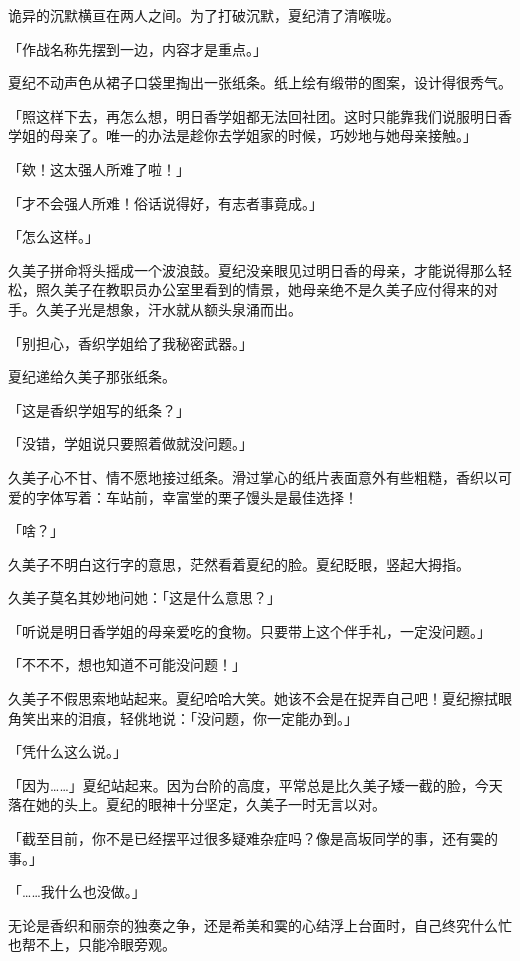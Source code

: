 \documentclass[UTF8]{ctexart}
\begin{document}
    诡异的沉默横亘在两人之间。为了打破沉默，夏纪清了清喉咙。 

    「作战名称先摆到一边，内容才是重点。」 

    夏纪不动声色从裙子口袋里掏出一张纸条。纸上绘有缎带的图案，设计得很秀气。 

    「照这样下去，再怎么想，明日香学姐都无法回社团。这时只能靠我们说服明日香学姐的母亲了。唯一的办法是趁你去学姐家的时候，巧妙地与她母亲接触。」 

    「欸！这太强人所难了啦！」 

    「才不会强人所难！俗话说得好，有志者事竟成。」 

    「怎么这样。」 

    久美子拼命将头摇成一个波浪鼓。夏纪没亲眼见过明日香的母亲，才能说得那么轻松，照久美子在教职员办公室里看到的情景，她母亲绝不是久美子应付得来的对手。久美子光是想象，汗水就从额头泉涌而出。 

    「别担心，香织学姐给了我秘密武器。」 

    夏纪递给久美子那张纸条。 

    「这是香织学姐写的纸条？」 

    「没错，学姐说只要照着做就没问题。」 

    久美子心不甘、情不愿地接过纸条。滑过掌心的纸片表面意外有些粗糙，香织以可爱的字体写着：车站前，幸富堂的栗子馒头是最佳选择！ 

    「啥？」 

    久美子不明白这行字的意思，茫然看着夏纪的脸。夏纪眨眼，竖起大拇指。 

    久美子莫名其妙地问她：「这是什么意思？」 

    「听说是明日香学姐的母亲爱吃的食物。只要带上这个伴手礼，一定没问题。」 

    「不不不，想也知道不可能没问题！」 

    久美子不假思索地站起来。夏纪哈哈大笑。她该不会是在捉弄自己吧！夏纪擦拭眼角笑出来的泪痕，轻佻地说：「没问题，你一定能办到。」 

    「凭什么这么说。」 

    「因为……」夏纪站起来。因为台阶的高度，平常总是比久美子矮一截的脸，今天落在她的头上。夏纪的眼神十分坚定，久美子一时无言以对。 

    「截至目前，你不是已经摆平过很多疑难杂症吗？像是高坂同学的事，还有霙的事。」 

    「……我什么也没做。」 

    无论是香织和丽奈的独奏之争，还是希美和霙的心结浮上台面时，自己终究什么忙也帮不上，只能冷眼旁观。 
\end{document}
